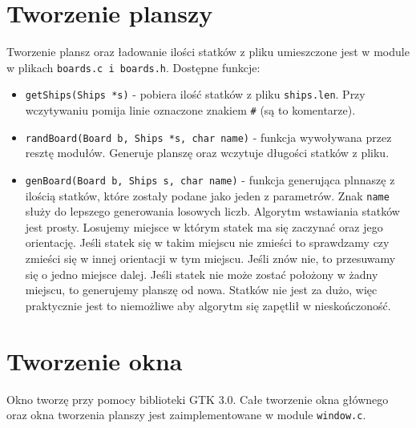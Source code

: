 \documentclass[a4paper]{article}
\begin{document}
\section{Tworzenie planszy}
Tworzenie plansz oraz ładowanie ilości statków z pliku umieszczone jest w module w plikach \texttt{boards.c i boards.h}. 
Dostępne funkcje:
\begin{itemize}
    \item \texttt{getShips(Ships *s)} - pobiera ilość statków z pliku \texttt{ships.len}. Przy wczytywaniu
pomija linie oznaczone znakiem \texttt{\#} (są to komentarze).
    \item \texttt{randBoard(Board b, Ships *s, char name)} - funkcja wywoływana przez resztę modułów.
Generuje planszę oraz wczytuje długości statków z pliku.
    \item \texttt{genBoard(Board b, Ships s, char name)} - funkcja generująca plnnaszę z ilością statków,
które zostały podane jako jeden z parametrów. Znak \texttt{name} służy do lepszego generowania losowych liczb. 
Algorytm wstawiania statków jest prosty. Losujemy miejsce w którym statek ma się zaczynać oraz jego orientację. 
Jeśli statek się w takim miejscu nie zmieści to sprawdzamy czy zmieści się w innej orientacji w tym miejscu. 
Jeśli znów nie, to przesuwamy się o jedno miejsce dalej. Jeśli statek nie może zostać położony w żadny miejscu,
to generujemy planszę od nowa. Statków nie jest za dużo, więc praktycznie jest to niemożliwe aby algorytm się zapętlił w nieskończoność.
\end{itemize}

\section{Tworzenie okna}
Okno tworzę przy pomocy biblioteki GTK 3.0. Całe tworzenie okna głównego oraz okna tworzenia planszy jest zaimplementowane w module \texttt{window.c}.
\end{document}
